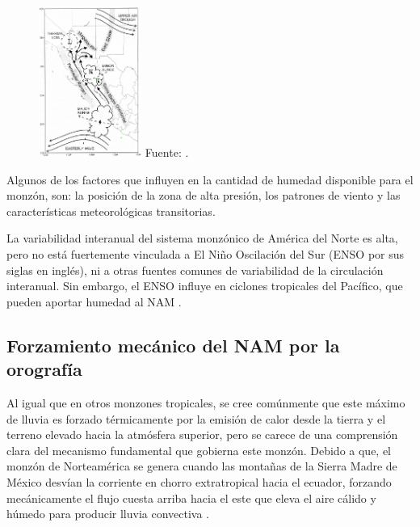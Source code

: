 \documentclass[12pt]{article}
\begin{document}
\begin{figure}[H]
	\begin{center}
 		\includegraphics[width = 0.3\textwidth]{Imagenes/Humedad GC.png}
 		Fuente: \cite{adams1997north}.
	\end{center} 
\end{figure}

Algunos de los factores que influyen en la cantidad de humedad disponible para el monzón, son: la posición de la zona de alta presión, los patrones de viento y las características meteorológicas transitorias.

La variabilidad interanual del sistema monzónico de América del Norte es alta, pero no está fuertemente vinculada a El Niño Oscilación del Sur (ENSO por sus siglas en inglés), ni a otras fuentes comunes de variabilidad de la circulación interanual. Sin embargo, el ENSO influye en ciclones tropicales del Pacífico, que pueden aportar humedad al NAM \cite{Climategov}.

\subsection{Forzamiento mecánico del NAM por la orografía}

Al igual que en otros monzones tropicales, se cree comúnmente que este máximo de lluvia es forzado térmicamente por la emisión de calor desde la tierra y el terreno elevado hacia la atmósfera superior, pero se carece de una comprensión clara del mecanismo fundamental que gobierna este monzón. Debido a que, el monzón de Norteamérica se genera cuando las montañas de la Sierra Madre de México desvían la corriente en chorro extratropical hacia el ecuador, forzando mecánicamente el flujo cuesta arriba hacia el este que eleva el aire cálido y húmedo para producir lluvia convectiva \cite{boos2021}.
\end{document}
